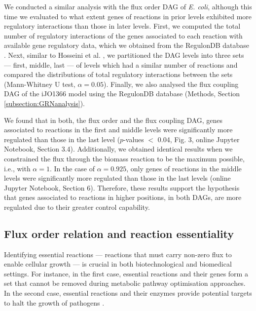 \documentclass[12pt]{article}
\begin{document}
We conducted a similar analysis with the flux order DAG of \emph{E. coli}, although this time we evaluated to what extent genes of reactions in prior levels exhibited more regulatory interactions than those in later levels. First, we computed the total number of regulatory interactions of the genes associated to each reaction with available gene regulatory data, which we obtained from the RegulonDB database \cite{Gama-Castro2016}. Next, similar to Hosseini et al. \cite{Hosseini2015}, we partitioned the DAG levels into three sets --- first, middle, last --- of levels which had a similar number of reactions and compared the distributions of total regulatory interactions between the sets (Mann-Whitney U test, $\alpha = 0.05$). Finally, we also analysed the flux coupling DAG of the iJO1366 model using the RegulonDB database (Methods, Section \ref{subsection:GRNanalysis}).

We found that in both, the flux order and the flux coupling DAG, genes associated to reactions in the first and middle levels were significantly more regulated than those in the last level ($p$-values $<$ 0.04, Fig. 3, online Jupyter Notebook, Section 3.4). Additionally, we obtained identical results when we constrained the flux through the biomass reaction to be the maximum possible, i.e., with $\alpha=1$. In the case of $\alpha=0.925$, only genes of reactions in the middle levels were significantly more regulated than those in the last levels (online Jupyter Notebook, Section 6). Therefore, these results support the hypothesis that genes associated to reactions in higher positions, in both DAGs, are more regulated due to their greater control capability.

\subsection{Flux order relation and reaction essentiality}
Identifying essential reactions --- reactions that must carry non-zero flux to enable cellular growth --- is crucial in both biotechnological and biomedical settings. For instance, in the first case, essential reactions and their genes form a set that cannot be removed during metabolic pathway optimisation approaches. In the second case, essential reactions and their enzymes provide potential targets to halt the growth of pathogens \cite{Gatto2015,Salleh2013,Xavier2018}.
\end{document}
